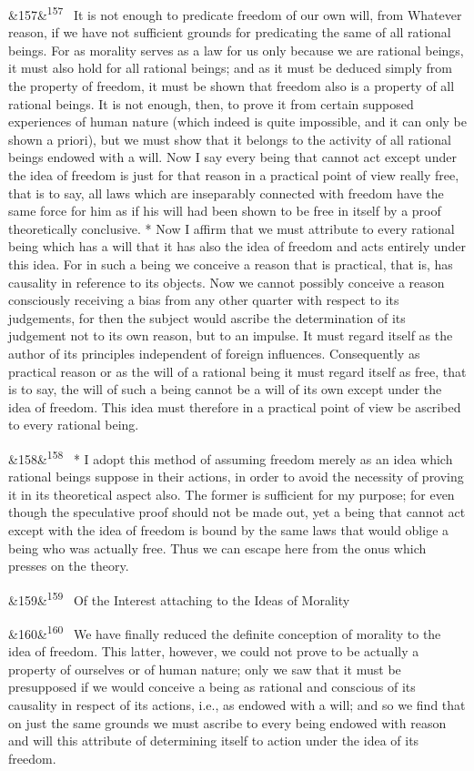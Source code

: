 \documentclass[12pt]{article}
\newcommand{\para}[1][]{\par\noindent\ifx&#1&\else\textsuperscript{\footnotesize #1}~\fi}
\begin{document}
\para[157] It is not enough to predicate freedom of our own will, from Whatever reason, if we have not sufficient grounds for predicating the same of all rational beings. For as morality serves as a law for us only because we are rational beings, it must also hold for all rational beings; and as it must be deduced simply from the property of freedom, it must be shown that freedom also is a property of all rational beings. It is not enough, then, to prove it from certain supposed experiences of human nature (which indeed is quite impossible, and it can only be shown a priori), but we must show that it belongs to the activity of all rational beings endowed with a will. Now I say every being that cannot act except under the idea of freedom is just for that reason in a practical point of view really free, that is to say, all laws which are inseparably connected with freedom have the same force for him as if his will had been shown to be free in itself by a proof theoretically conclusive. * Now I affirm that we must attribute to every rational being which has a will that it has also the idea of freedom and acts entirely under this idea. For in such a being we conceive a reason that is practical, that is, has causality in reference to its objects. Now we cannot possibly conceive a reason consciously receiving a bias from any other quarter with respect to its judgements, for then the subject would ascribe the determination of its judgement not to its own reason, but to an impulse. It must regard itself as the author of its principles independent of foreign influences. Consequently as practical reason or as the will of a rational being it must regard itself as free, that is to say, the will of such a being cannot be a will of its own except under the idea of freedom. This idea must therefore in a practical point of view be ascribed to every rational being.

\para[158] * I adopt this method of assuming freedom merely as an idea which rational beings suppose in their actions, in order to avoid the necessity of proving it in its theoretical aspect also. The former is sufficient for my purpose; for even though the speculative proof should not be made out, yet a being that cannot act except with the idea of freedom is bound by the same laws that would oblige a being who was actually free. Thus we can escape here from the onus which presses on the theory.

\para[159] Of the Interest attaching to the Ideas of Morality

\para[160] We have finally reduced the definite conception of morality to the idea of freedom. This latter, however, we could not prove to be actually a property of ourselves or of human nature; only we saw that it must be presupposed if we would conceive a being as rational and conscious of its causality in respect of its actions, i.e., as endowed with a will; and so we find that on just the same grounds we must ascribe to every being endowed with reason and will this attribute of determining itself to action under the idea of its freedom.
\end{document}
